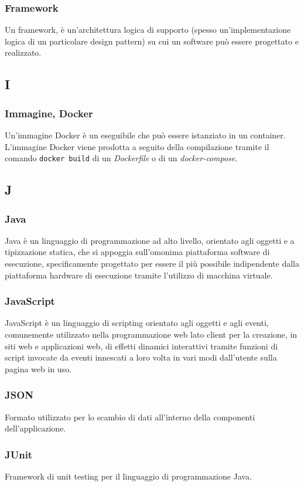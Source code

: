\subsubsection{Framework}  Un framework, è un'architettura logica di supporto (spesso un'implementazione logica di un particolare design pattern) su cui un software può essere progettato e realizzato.
\subsection{I}
\subsubsection{Immagine, Docker} Un'immagine Docker è un eseguibile che può essere istanziato in un container. L'immagine Docker viene prodotta a seguito della compilazione tramite il comando \verb!docker build! di un \textit{Dockerfile} o di un \textit{docker-compose}.
\subsection{J}
\subsubsection{Java}  Java è un linguaggio di programmazione ad alto livello, orientato agli oggetti e a tipizzazione statica, che si appoggia sull'omonima piattaforma software di esecuzione, specificamente progettato per essere il più possibile indipendente dalla piattaforma hardware di esecuzione tramite l'utilizzo di macchina virtuale.
\subsubsection{JavaScript}  JavaScript è un linguaggio di scripting orientato agli oggetti e agli eventi, comunemente utilizzato nella programmazione web lato client per la creazione, in siti web e applicazioni web, di effetti dinamici interattivi tramite funzioni di script invocate da eventi innescati a loro volta in vari modi dall'utente sulla pagina web in uso.
\subsubsection*{JSON}
Formato utilizzato per lo scambio di dati all'interno della componenti dell'applicazione.
\subsubsection*{JUnit}
Framework di unit testing per il linguaggio di programmazione Java.
